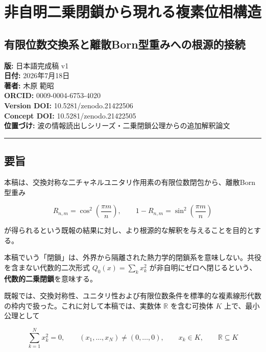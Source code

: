 \documentclass[
  a4paper,
  10pt]{article}
\author{}
\date{}
\begin{document}
\section{非自明二乗閉鎖から現れる複素位相構造}\label{ux975eux81eaux660eux4e8cux4e57ux9589ux9396ux304bux3089ux73feux308cux308bux8907ux7d20ux4f4dux76f8ux69cbux9020}

\subsection{有限位数交換系と離散Born型重みへの根源的接続}\label{ux6709ux9650ux4f4dux6570ux4ea4ux63dbux7cfbux3068ux96e2ux6563bornux578bux91cdux307fux3078ux306eux6839ux6e90ux7684ux63a5ux7d9a}

\textbf{版:} 日本語完成稿 v1\\
\textbf{日付:} 2026年7月18日\\
\textbf{著者:} 木原 範昭\\
\textbf{ORCID:} 0009-0004-6753-4020\\
\textbf{Version DOI:} 10.5281/zenodo.21422506\\
\textbf{Concept DOI:} 10.5281/zenodo.21422505\\
\textbf{位置づけ:}
波の情報読出しシリーズ・二乗閉鎖公理からの追加解釈論文

\begin{center}\rule{0.5\linewidth}{0.5pt}\end{center}

\subsection{要旨}\label{ux8981ux65e8}

本稿は、交換対称な二チャネルユニタリ作用素の有限位数閉包から、離散Born型重み

\[
R_{n,m}=\cos^2\left(\frac{\pi m}{n}\right),
\qquad
1-R_{n,m}=\sin^2\left(\frac{\pi m}{n}\right)
\]

が得られるという既報の結果に対し、より根源的な解釈を与えることを目的とする。

本稿でいう「閉鎖」は、外界から隔離された熱力学的閉鎖系を意味しない。共役を含まない代数的二次形式
\(Q_0(x)=\sum_kx_k^2\)
が非自明にゼロへ閉じるという、\textbf{代数的二乗閉鎖}を意味する。

既報では、交換対称性、ユニタリ性および有限位数条件を標準的な複素線形代数の枠内で扱った。これに対して本稿では、実数体
\(\mathbb R\) を含む可換体 \(K\) 上で、最小公理として

\[
\boxed{
\sum_{k=1}^{N}x_k^2=0,
\qquad
(x_1,\ldots,x_N)\neq(0,\ldots,0),
\qquad
x_k\in K,
\qquad
\mathbb R\subseteq K
}
\]
\end{document}
